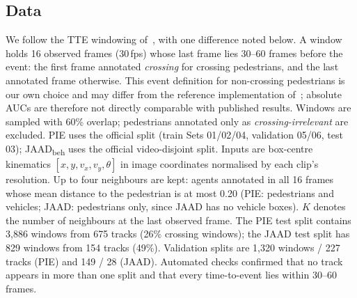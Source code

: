 \documentclass[conference]{IEEEtran}
\begin{document}
\subsection{Data}
We follow the TTE windowing of~\cite{kotseruba2021benchmark}, with one difference noted below. A window holds 16 observed frames (30\,fps) whose last frame lies 30--60 frames before the event: the first frame annotated \emph{crossing} for crossing pedestrians, and the last annotated frame otherwise. This event definition for non-crossing pedestrians is our own choice and may differ from the reference implementation of~\cite{kotseruba2021benchmark}; absolute AUCs are therefore not directly comparable with published results. Windows are sampled with 60\% overlap; pedestrians annotated only as \emph{crossing-irrelevant} are excluded. PIE uses the official split (train Sets 01/02/04, validation 05/06, test 03); JAAD\textsubscript{beh} uses the official video-disjoint split. Inputs are box-centre kinematics $[x, y, v_x, v_y, \theta]$ in image coordinates normalised by each clip's resolution. Up to four neighbours are kept: agents annotated in all 16 frames whose mean distance to the pedestrian is at most 0.20 (PIE: pedestrians and vehicles; JAAD: pedestrians only, since JAAD has no vehicle boxes). $K$ denotes the number of neighbours at the last observed frame. The PIE test split contains 3{,}886 windows from 675 tracks (26\% crossing windows); the JAAD test split has 829 windows from 154 tracks (49\%). Validation splits are 1{,}320 windows / 227 tracks (PIE) and 149 / 28 (JAAD). Automated checks confirmed that no track appears in more than one split and that every time-to-event lies within 30--60 frames.
\end{document}
